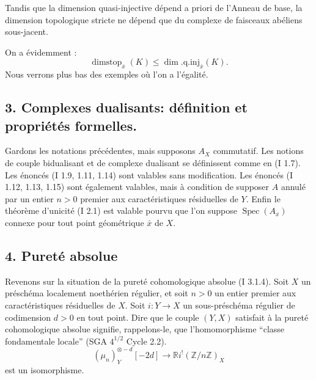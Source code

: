 \documentclass[11pt]{article}
\DeclareMathOperator{\Spec}{Spec}
\newcommand{\R}{\mathbb{R}}\newcommand{\RHomCore}{\mathbb{R}\mathrm{Hom}}
\newcommand{\Z}{\mathbb{Z}}
\providecommand{\R}{\mathrm R}
\providecommand{\Z}{\mathbb Z}
\providecommand{\Spec}{\operatorname{Spec}}
\providecommand{\Spec}{\operatorname{Spec}}
\providecommand{\Spec}{\operatorname{Spec}}
\providecommand{\Spec}{\operatorname{Spec}}
\begin{document}
Tandis que la dimension quasi-injective dépend a priori de l'Anneau 
de base, la
dimension topologique stricte ne dépend que du complexe de faisceaux abéliens sous-jacent.

On a évidemment :
\[
        \operatorname{dimstop}_{\bar{x}}(K)\leq \dim.\mathrm{q.inj}_{\bar{x}}(K).
\]
Nous verrons plus bas des exemples où l'on a l'égalité.

\subsection*{3. Complexes dualisants: définition et propriétés formelles.}

Gardons les notations précédentes, mais supposons $A_X$ commutatif. Les notions de couple bidualisant et de complexe dualisant se définissent comme en (I 1.7). Les énoncés (I 1.9, 1.11, 1.14) sont valables sans modification. Les énoncés (I 1.12, 1.13, 1.15) sont également valables, mais à condition de supposer $A$ annulé par un entier $n>0$ premier aux caractéristiques résiduelles de $Y$. Enfin le théorème d'unicité (I 2.1) est valable pourvu que l'on suppose $\Spec(A_{\bar{x}})$ connexe pour tout point géométrique $\bar{x}$ de $X$.

\subsection*{4. Pureté absolue}

Revenons sur la situation de la pureté cohomologique absolue (I 3.1.4). Soit $X$ un préschéma localement noethérien régulier, et soit $n>0$ un entier premier aux caractéristiques résiduelles de $X$. Soit $i:Y\to X$ un sous-préschéma régulier de codimension $d>0$ en tout point. Dire que le couple $(Y,X)$ satisfait à la pureté cohomologique absolue signifie, rappelons-le, que l'homomorphisme ``classe fondamentale locale'' (SGA $4^{1/2}$ Cycle 2.2).
\begin{equation}\tag{4.1}
        (\mu_n)_Y^{\otimes -d}[-2d]\longrightarrow \R i^!(\Z/n\Z)_X
\end{equation}
est un
isomorphisme.
\end{document}
